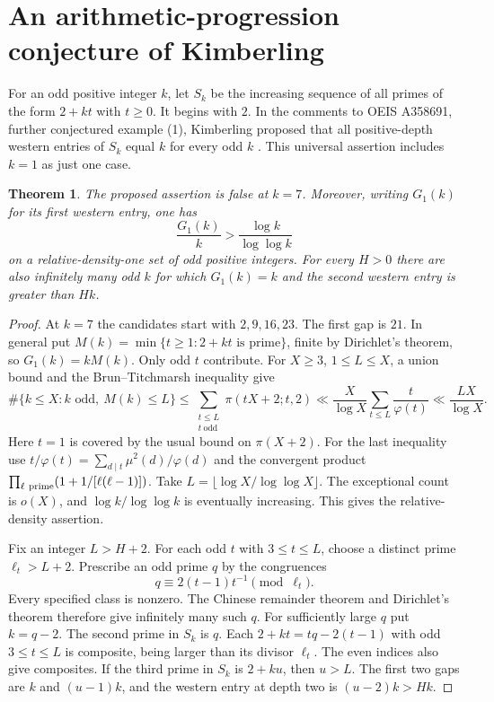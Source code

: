 \documentclass[11pt,a4paper]{article}
\newtheorem{theorem}{Theorem}[section]
\begin{document}
\section{An arithmetic-progression conjecture of Kimberling}
\label{sec:kim}
For an odd positive integer $k$, let $S_k$ be the increasing sequence of all primes of the form $2+kt$ with $t\ge0$. It begins with $2$. In the comments to OEIS A358691, further conjectured example (1), Kimberling proposed that all positive-depth western entries of $S_k$ equal $k$ for every odd $k$ \cite{kim}. This universal assertion includes $k=1$ as just one case.

\begin{theorem}\label{thm:kim}
The proposed assertion is false at $k=7$. Moreover, writing $G_1(k)$ for its first western entry, one has
\[
 \frac{G_1(k)}{k}>\frac{\log k}{\log\log k}
\]
on a relative-density-one set of odd positive integers. For every $H>0$ there are also infinitely many odd $k$ for which $G_1(k)=k$ and the second western entry is greater than $Hk$.
\end{theorem}
\begin{proof}
At $k=7$ the candidates start with $2,9,16,23$. The first gap is $21$. In general put $M(k)=\min\{t\ge1:2+kt\text{ is prime}\}$, finite by Dirichlet's theorem, so $G_1(k)=kM(k)$. Only odd $t$ contribute. For $X\ge3$, $1\le L\le X$, a union bound and the Brun--Titchmarsh inequality \cite{bt} give
\[
 \#\{k\le X:k\text{ odd},\ M(k)\le L\}
 \le\sum_{\substack{t\le L\\t\ \mathrm{odd}}}\pi(tX+2;t,2)
 \ll \frac{X}{\log X}\sum_{t\le L}\frac{t}{\varphi(t)}
 \ll \frac{LX}{\log X}.
\]
Here $t=1$ is covered by the usual bound on $\pi(X+2)$. For the last inequality use $t/\varphi(t)=\sum_{d\mid t}\mu^2(d)/\varphi(d)$ and the convergent product $\prod_{\ell\ {\rm prime}}(1+1/[\ell(\ell-1)])$. Take $L=\lfloor\log X/\log\log X\rfloor$. The exceptional count is $o(X)$, and $\log k/\log\log k$ is eventually increasing. This gives the relative-density assertion.

Fix an integer $L>H+2$. For each odd $t$ with $3\le t\le L$, choose a distinct prime $\ell_t>L+2$. Prescribe an odd prime $q$ by the congruences
\[
 q\equiv 2(t-1)t^{-1}\pmod{\ell_t}.
\]
Every specified class is nonzero. The Chinese remainder theorem and Dirichlet's theorem therefore give infinitely many such $q$. For sufficiently large $q$ put $k=q-2$. The second prime in $S_k$ is $q$. Each $2+kt=tq-2(t-1)$ with odd $3\le t\le L$ is composite, being larger than its divisor $\ell_t$. The even indices also give composites. If the third prime in $S_k$ is $2+ku$, then $u>L$. The first two gaps are $k$ and $(u-1)k$, and the western entry at depth two is $(u-2)k>Hk$.
\end{proof}
\end{document}
